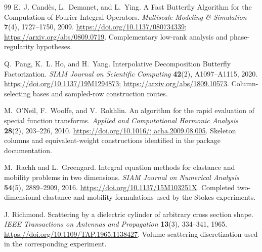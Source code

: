 \documentclass[11pt,a4paper]{article}
\begin{document}
\begin{thebibliography}{99}
E.~J. Cand\`es, L.~Demanet, and L.~Ying.
A Fast Butterfly Algorithm for the Computation of Fourier Integral Operators.
\emph{Multiscale Modeling \& Simulation} \textbf{7}(4), 1727--1750, 2009.
\url{https://doi.org/10.1137/080734339}; \url{https://arxiv.org/abs/0809.0719}.
Complementary low-rank analysis and phase-regularity hypotheses.

Q.~Pang, K.~L. Ho, and H.~Yang.
Interpolative Decomposition Butterfly Factorization.
\emph{SIAM Journal on Scientific Computing} \textbf{42}(2), A1097--A1115, 2020.
\url{https://doi.org/10.1137/19M1294873}; \url{https://arxiv.org/abs/1809.10573}.
Column-selecting bases and sampled-row construction routes.

M.~O'Neil, F.~Woolfe, and V.~Rokhlin.
An algorithm for the rapid evaluation of special function transforms.
\emph{Applied and Computational Harmonic Analysis} \textbf{28}(2), 203--226, 2010.
\url{https://doi.org/10.1016/j.acha.2009.08.005}.
Skeleton columns and equivalent-weight constructions identified in the package documentation.

M.~Rachh and L.~Greengard.
Integral equation methods for elastance and mobility problems in two dimensions.
\emph{SIAM Journal on Numerical Analysis} \textbf{54}(5), 2889--2909, 2016.
\url{https://doi.org/10.1137/15M103251X}.
Completed two-dimensional elastance and mobility formulations used by the Stokes experiments.

J. Richmond.
Scattering by a dielectric cylinder of arbitrary cross section shape.
\emph{IEEE Transactions on Antennas and Propagation} \textbf{13}(3), 334--341, 1965.
\url{https://doi.org/10.1109/TAP.1965.1138427}.
Volume-scattering discretization used in the corresponding experiment.

\end{thebibliography}
\end{document}
